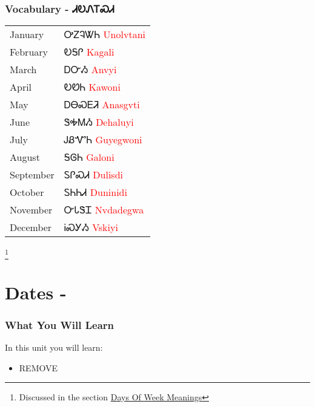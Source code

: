 \subsection{Vocabulary - ᏗᎧᏁᎢᏍᏗ 
}
\begin{tabular}{p{3cm} p{11cm}}
January & ᎤᏃᎸᏔᏂ 
 \newline \textcolor{red}{Unolvtani}\\
February & ᎧᎦᎵ 
 \newline \textcolor{red}{Kagali}\\
March & ᎠᏅᏱ 
 \newline \textcolor{red}{Anvyi}\\
April & ᎧᏬᏂ 
 \newline \textcolor{red}{Kawoni}\\
May & ᎠᎾᏍᎬᏘ 
 \newline \textcolor{red}{Anasgvti}\\
June & ᏕᎭᎷᏱ 
 \newline \textcolor{red}{Dehaluyi}\\
July & ᎫᏰᏉᏂ 
 \newline \textcolor{red}{Guyegwoni}\\
August & ᎦᎶᏂ 
 \newline \textcolor{red}{Galoni}\\
September & ᏚᎵᏍᏗ 
 \newline \textcolor{red}{Dulisdi}\\
October & ᏚᏂᏂᏗ 
 \newline \textcolor{red}{Duninidi}\\
November & ᏅᏓᏕᏆ 
 \newline \textcolor{red}{Nvdadegwa}\\
December & ᎥᏍᎩᏱ 
 \newline \textcolor{red}{Vskiyi}\\
\end{tabular}

\footnote{Discussed in the section \hyperref[sec:daysOfWeekMeaning]{Days Of Week Meanings}}
\index{}
\chapter{Dates - }
\subsection{What You Will Learn}
In this unit you will learn:
\begin{itemize}
\item REMOVE
\end{itemize}\newpage

